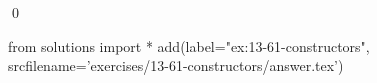
\begin{ex}
  \label{ex:13-61-constructors}
  
  \qed
\end{ex}
\begin{python0}
from solutions import *
add(label="ex:13-61-constructors",
    srcfilename='exercises/13-61-constructors/answer.tex')
\end{python0}
